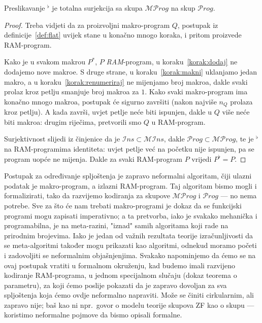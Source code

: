 \begin{propozicija}
Preslikavanje ${}^\flat$ je totalna surjekcija sa skupa $\mathcal{MP}rog$ na skup $\mathcal Prog$.
\end{propozicija}
\begin{proof}
Treba vidjeti da za proizvoljni makro-program $Q$, postupak iz definicije~\ref{def:flat} uvijek stane u konačno mnogo koraka, i pritom proizvede RAM-program.

Kako je u svakom makrou $P^*$, $P$ \emph{RAM}-program, u koraku~\ref{korak:dodaj} ne dodajemo nove makroe. S druge strane, u koraku~\ref{korak:makni} uklanjamo jedan makro, a u koraku~\ref{korak:renumeriraj} ne mijenjamo broj makroa, dakle svaki prolaz kroz petlju smanjuje broj makroa za $1$. Kako svaki makro-program ima konačno mnogo makroa, postupak će sigurno završiti (nakon najviše $n_Q$ prolaza kroz petlju). A kada završi, uvjet petlje neće biti ispunjen, dakle u $Q$ više neće biti makroa: drugim riječima, pretvorili smo  $Q$ u RAM-program.

Surjektivnost slijedi iz činjenice da je $\mathcal Ins\subset\mathcal{MI}ns$, dakle $\mathcal Prog\subset\mathcal{MP}rog$, te je ${}^\flat$ na RAM-programima identiteta: uvjet petlje već na početku nije ispunjen, pa se program uopće ne mijenja. Dakle za svaki RAM-program $P$ vrijedi $P^\flat=P$.
\end{proof}

Postupak za određivanje spljoštenja je zapravo neformalni algoritam, čiji ulazni podatak je makro-program, a izlazni RAM-program. Taj algoritam bismo mogli i formalizirati, tako da razvijemo kodiranja za skupove $\mathcal{MP}rog$ i $\mathcal Prog$ --- no nema potrebe. Sve za što će nam trebati makro-programi je dokaz da se funkcijski programi mogu zapisati imperativno; a ta pretvorba, iako je svakako mehanička i programabilna, je na meta-razini, "iznad" samih algoritama koji rade na prirodnim brojevima. Iako je jedan od važnih rezultata teorije izračunljivosti da se meta-algoritmi također mogu prikazati kao algoritmi, odnekud moramo početi i zadovoljiti se neformalnim objašnjenjima. Svakako napominjemo da ćemo se na ovaj postupak vratiti u formalnom okruženju, kad budemo imali razvijeno kodiranje RAM-programa, u jednom specijalnom slučaju (dokaz teorema o parametru), za koji ćemo poslije pokazati da je zapravo dovoljan za sva spljoštenja koja ćemo ovdje neformalno napraviti. Može se činiti cirkularnim, ali zapravo nije; baš kao ni npr.\ govor o modelu teorije skupova ZF kao o skupu --- koristimo neformalne pojmove da bismo opisali formalne.

